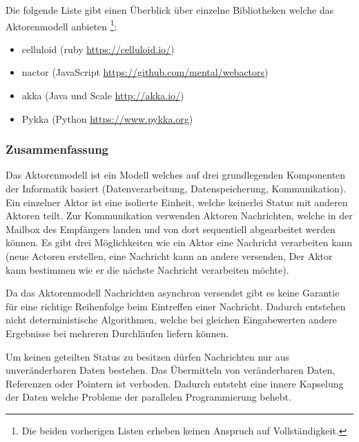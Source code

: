 Die folgende Liste gibt einen Überblick über einzelne Bibliotheken welche das Aktorenmodell anbieten \footnote{Die beiden vorherigen Listen erheben keinen Anspruch auf Vollständigkeit.}:

\begin{itemize}
  \item celluloid (ruby \url{https://celluloid.io/})
  \item nactor (JavaScript \url{https://github.com/mental/webactors})
  \item akka (Java und Scale \url{http://akka.io/})
  \item Pykka (Python \url{https://www.pykka.org})
\end{itemize}

\subsubsection{Zusammenfassung}
Das Aktorenmodell ist ein Modell welches auf drei grundlegenden Komponenten der Informatik basiert (Datenverarbeitung, Datenspeicherung, Kommunikation). Ein einzelner Aktor ist eine isolierte Einheit, welche keinerlei Status mit anderen Aktoren teilt. Zur Kommunikation verwenden Aktoren Nachrichten, welche in der Mailbox des Empfängers landen und von dort sequentiell abgearbeitet werden können. Es gibt drei Möglichkeiten wie ein Aktor eine Nachricht verarbeiten kann (neue Actoren erstellen, eine Nachricht kann an andere versenden, Der Aktor kann bestimmen wie er die nächste Nachricht verarbeiten möchte).

Da das Aktorenmodell Nachrichten asynchron versendet gibt es keine Garantie für eine richtige Reihenfolge beim Eintreffen einer Nachricht. Dadurch entstehen nicht deterministische Algorithmen, welche bei gleichen Eingabewerten andere Ergebnisse bei mehreren Durchläufen liefern können. 

Um keinen geteilten Status zu besitzen dürfen Nachrichten nur aus unveränderbaren Daten bestehen. Das Übermitteln von veränderbaren Daten, Referenzen oder Pointern ist verboden. Dadurch entsteht eine innere Kapselung der Daten welche Probleme der parallelen Programmierung behebt.
